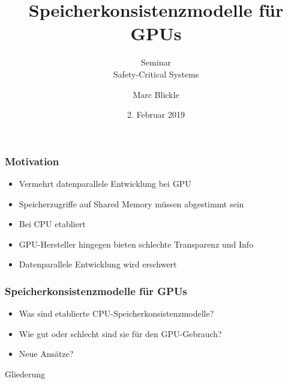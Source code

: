 \documentclass{sikslides}
\title[Speicherkonsistenzmodelle für GPUs]{Speicherkonsistenzmodelle für GPUs}
\subtitle{Seminar \\Safety-Critical Systems}
\author{Marc Blickle}
\date[01.02.2019]{2. Februar 2019}
\begin{document}
\titleframe


\begin{frame}
	\frametitle{Motivation}
	\begin{itemize}
		\item Vermehrt datenparallele Entwicklung bei GPU
\bigskip
		\item Speicherzugriffe auf Shared Memory müssen abgestimmt sein
\bigskip
		\item Bei CPU etabliert
\bigskip \item GPU-Hersteller hingegen bieten schlechte Transparenz und Info
\bigskip
		\item Datenparallele Entwicklung wird erschwert
	\end{itemize}

\end{frame}

\begin{frame}
\frametitle{Speicherkonsistenzmodelle für GPUs}
	    \begin{itemize}
	\item Was sind etablierte CPU-Speicherkonsistenzmodelle?
\bigskip
    \item Wie gut oder schlecht sind sie für den GPU-Gebrauch?
\bigskip
	\item Neue Ansätze?
    \end{itemize}
\end{frame}


\begin{frame}{Gliederung}
   
    \tableofcontents[hideallsubsections]
\end{frame}


\end{document}
